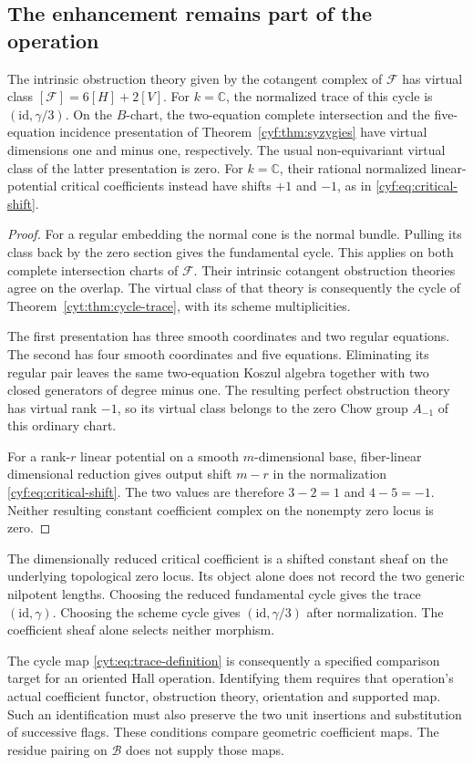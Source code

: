 \subsection{The enhancement remains part of the operation}

\begin{proposition}\label{cyt:prop:enhancements}
The intrinsic obstruction theory given by the cotangent
complex of \(\mathscr F\) has virtual class
\([\mathscr F]=6[H]+2[V]\). For \(k=\mathbb C\), the
normalized trace of this cycle is \((\mathrm{id},\gamma/3)\).
On the \(B\)-chart, the two-equation complete intersection
and the five-equation incidence presentation of
Theorem~\ref{cyf:thm:syzygies} have virtual dimensions one
and minus one, respectively. The usual non-equivariant
virtual class of the latter presentation is zero.
For \(k=\mathbb C\), their rational normalized
linear-potential critical coefficients instead have shifts
\(+1\) and \(-1\), as in
\eqref{cyf:eq:critical-shift}.
\end{proposition}

\begin{proof}
For a regular embedding the normal cone is the normal
bundle. Pulling its class back by the zero section gives
the fundamental cycle. This applies on both complete
intersection charts of \(\mathscr F\). Their intrinsic
cotangent obstruction theories agree on the overlap.
The virtual class of that theory is consequently the cycle
of Theorem~\ref{cyt:thm:cycle-trace}, with its scheme
multiplicities.

The first presentation has three smooth coordinates and
two regular equations. The second has four smooth
coordinates and five equations. Eliminating its regular
pair leaves the same two-equation Koszul algebra together
with two closed generators of degree minus one.
The resulting perfect obstruction theory has virtual
rank \(-1\), so its virtual class belongs to the zero
Chow group \(A_{-1}\) of this ordinary chart.

For a rank-\(r\) linear potential on a smooth
\(m\)-dimensional base, fiber-linear dimensional reduction
gives output shift \(m-r\) in the normalization
\eqref{cyf:eq:critical-shift}. The two values are therefore
\(3-2=1\) and \(4-5=-1\). Neither resulting constant
coefficient complex on the nonempty zero locus is zero.
\end{proof}

The dimensionally reduced critical coefficient is a shifted
constant sheaf on the underlying topological zero locus.
Its object alone does not record the two generic nilpotent lengths.
Choosing the reduced fundamental cycle gives the trace
\((\mathrm{id},\gamma)\). Choosing the scheme cycle gives
\((\mathrm{id},\gamma/3)\) after normalization.
The coefficient sheaf alone selects neither morphism.

The cycle map \eqref{cyt:eq:trace-definition} is consequently
a specified comparison target for an oriented Hall operation.
Identifying them requires that operation's actual coefficient
functor, obstruction theory, orientation and supported map.
Such an identification must also preserve the two unit
insertions and substitution of successive flags. These
conditions compare geometric coefficient maps. The residue
pairing on \(\mathcal B\) does not supply those maps.
